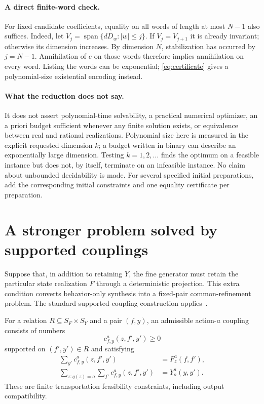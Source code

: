 \documentclass[11pt]{article}
\begin{document}
\paragraph{A direct finite-word check.}
For fixed candidate coefficients, equality on all words of length at most $N-1$ also suffices. Indeed, let $V_j=\operatorname{span}\{dD_w:|w|\leq j\}$. If $V_j=V_{j+1}$ it is already invariant; otherwise its dimension increases. By dimension $N$, stabilization has occurred by $j=N-1$. Annihilation of $e$ on those words therefore implies annihilation on every word. Listing the words can be exponential; \eqref{eq:certificate} gives a polynomial-size existential encoding instead.

\paragraph{What the reduction does not say.}
It does not assert polynomial-time solvability, a practical numerical optimizer, an a priori budget sufficient whenever any finite solution exists, or equivalence between real and rational realizations. Polynomial size here is measured in the explicit requested dimension $k$; a budget written in binary can describe an exponentially large dimension. Testing $k=1,2,\ldots$ finds the optimum on a feasible instance but does not, by itself, terminate on an infeasible instance. No claim about unbounded decidability is made. For several specified initial preparations, add the corresponding initial constraints and one equality certificate per preparation.

\section{A stronger problem solved by supported couplings}
\label{sec:coupling}

Suppose that, in addition to retaining $Y$, the fine generator must retain the particular state realization $F$ through a deterministic projection. This extra condition converts behavior-only synthesis into a fixed-pair common-refinement problem. The standard supported-coupling construction applies~\cite{JL1991,FKPV2025}.

For a relation $R\subseteq S_F\times S_Y$ and a pair $(f,y)$, an admissible action-$a$ coupling consists of numbers
\[
 c_{f,y}^a(z,f',y')\geq0
\]
supported on $(f',y')\in R$ and satisfying
\begin{align}
 \sum_{y'} c_{f,y}^a(z,f',y')&=F_z^a(f,f'),
 \label{eq:couple-f}\\
 \sum_{z:q(z)=o}\sum_{f'} c_{f,y}^a(z,f',y')&=Y_o^a(y,y').
 \label{eq:couple-y}
\end{align}
These are finite transportation feasibility constraints, including output compatibility.
\end{document}

